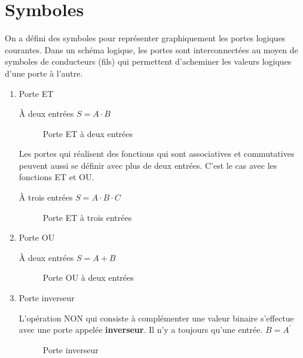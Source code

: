 \documentclass[letter, oneside]{book}
\begin{document}
\section{Symboles}
\label{sec:org4589f59}

On a défini des symboles pour représenter graphiquement les portes
logiques courantes. Dans un schéma logique, les portes sont
interconnectées au moyen de symboles de conducteurs
(fils) qui permettent d'acheminer les valeurs logiques d'une porte à
l'autre.

\begin{enumerate}
\item Porte ET
\label{sec:orgba655c8}

À deux entrées \(S =  A \cdot B\)

\begin{figure}[htbp]
\centering

\caption{\label{fig:org2aec91f}Porte ET à deux entrées}
\end{figure}

Les portes qui réalisent des fonctions qui sont associatives et
commutatives peuvent aussi se définir avec plus de deux entrées. C'est
le cas avec les fonctions ET et OU.

À trois entrées \(S =  A \cdot B \cdot C\)

\begin{figure}[htbp]
\centering

\caption{\label{fig:org1391af9}Porte ET à trois entrées}
\end{figure}

\item Porte OU
\label{sec:orgb19eed9}

À deux entrées \(S =  A + B\)

\begin{figure}[htbp]
\centering

\caption{\label{fig:orgfdc1702}Porte OU à deux entrées}
\end{figure}

\item Porte inverseur
\label{sec:org7c5f02f}

L'opération NON qui consiste à complémenter une valeur binaire
s'effectue avec une porte appelée \textbf{inverseur}.  Il n'y a toujours
qu'une entrée. \(B = A^\prime\)

\begin{figure}[htbp]
\centering

\caption{\label{fig:org14dd1ae}Porte inverseur}
\end{figure} 


\end{enumerate}
\end{document}
